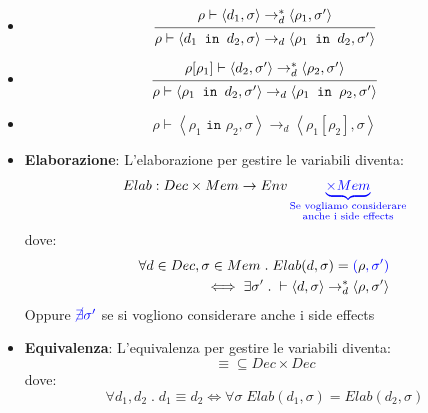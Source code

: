 \documentclass[a4paper]{article}
\begin{document}
\begin{itemize}
  \item
    \[
      \begin{prooftree}
        \hypo{ 
          \rho \vdash \left< d_1, \sigma \right> \to^*_d \left< \rho_1, \sigma' \right>
        }
        \infer1{ 
          \rho \vdash \left< d_1 \texttt{ in } d_2, \sigma \right> \to_d
          \left< \rho_1 \texttt{ in } d_2, \sigma' \right>
        }
      \end{prooftree}
    \] 

  \item 
    \[
      \begin{prooftree}
        \hypo{ 
          \rho[\rho_1] \vdash \left< d_2, \sigma' \right> \to^*_d \left< \rho_2,
          \sigma' \right>
        }
        \infer1{ 
          \rho \vdash \left< \rho_1 \texttt{ in } d_2, \sigma' \right> \to_d
          \left< \rho_1 \texttt{ in } \rho_2, \sigma' \right>
        }
      \end{prooftree}
    \] 

  \item 
    \[
      \rho \vdash \left< \rho_1 \texttt{ in } \rho_2, \sigma \right> \to_d
      \left< \rho_1[\rho_2], \sigma \right>
    \] 
\end{itemize}

\vspace{1em}
\noindent
\begin{itemize}
  \item \textbf{Elaborazione}:
    L'elaborazione per gestire le variabili diventa:
    \[
      Elab: Dec \times Mem \to Env \mathcolor{blue}{\underbrace{\times Mem}_{\substack{
            \text{Se vogliamo considerare}\\
            \text{anche i side effects}
          }
        }
      }
    \] 
    dove:
    \[
      \begin{aligned}
        \forall d \in Dec, \sigma \in Mem \;.\; Elab(d, \sigma) = \mathcolor{blue}{(}\rho
        \mathcolor{blue}{, \sigma')} \\
        \iff \exists \sigma' \;.\;
        \vdash \left< d, \sigma \right> \to^*_d \left< \rho, \sigma' \right>
      \end{aligned}
    \] 
    Oppure \( \mathcolor{blue}{\cancel \exists \sigma'} \) se si vogliono considerare
    anche i side effects

  \item \textbf{Equivalenza}:
    L'equivalenza per gestire le variabili diventa:
    \[
      \equiv \subseteq Dec \times Dec
    \] 
    dove:
    \[
      \forall d_1, d_2 \;.\; d_1 \equiv d_2 \iff
      \forall \sigma \; Elab(d_1, \sigma) = Elab(d_2, \sigma)
    \] 
\end{itemize}
\end{document}
